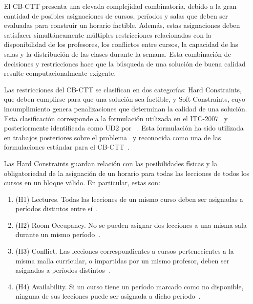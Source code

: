 \documentclass[letter, 10pt]{article}
\begin{document}
El CB-CTT presenta una elevada complejidad combinatoria, debido a la gran cantidad de posibles asignaciones de cursos, per\'iodos y salas que deben ser evaluadas para construir un horario factible. Adem\'as, estas asignaciones deben satisfacer simult\'aneamente m\'ultiples restricciones relacionadas con la disponibilidad de los profesores, los conflictos entre cursos, la capacidad de las salas y la distribuci\'on de las clases durante la semana. Esta combinaci\'on de decisiones y restricciones hace que la b\'usqueda de una soluci\'on de buena calidad resulte computacionalmente exigente.

Las restricciones del CB-CTT se clasifican en dos categor\'ias: Hard Constraints, que deben cumplirse para que una soluci\'on sea factible, y Soft Constraints, cuyo incumplimiento genera penalizaciones que determinan la calidad de una soluci\'on. Esta clasificaci\'on corresponde a la formulaci\'on utilizada en el ITC-2007~\cite{DiGaspero2007ITC} y posteriormente identificada como UD2 por ~\cite{Bonutti2012Benchmarking}. Esta formulaci\'on ha sido utilizada en trabajos posteriores sobre el problema~\cite{Hao2011LowerBounds} y reconocida como una de las formulaciones est\'andar para el CB-CTT~\cite{Ceschia2023Educational}.

Las Hard Constraints guardan relaci\'on con las posibilidades f\'isicas y la obligatoriedad de la asignaci\'on de un horario para todas las lecciones de todos los cursos en un bloque v\'alido. En particular, estas son:

\begin{enumerate}
    \item (H1) Lectures. Todas las lecciones de un mismo curso deben ser asignadas a per\'iodos distintos entre s\'i~\cite{Hao2011LowerBounds,DiGaspero2007ITC}.
    \item (H2) Room Occupancy. No se pueden asignar dos lecciones a una misma sala durante un mismo per\'iodo~\cite{Hao2011LowerBounds,DiGaspero2007ITC}.
    \item (H3) Conflict. Las lecciones correspondientes a cursos pertenecientes a la misma malla curricular, o impartidas por un mismo profesor, deben ser asignadas a per\'iodos distintos~\cite{Hao2011LowerBounds,Ceschia2023Educational,DiGaspero2007ITC}.
    \item (H4) Availability. Si un curso tiene un per\'iodo marcado como no disponible, ninguna de sus lecciones puede ser asignada a dicho per\'iodo~\cite{Hao2011LowerBounds,Ceschia2023Educational,DiGaspero2007ITC}.
\end{enumerate}
\end{document}
